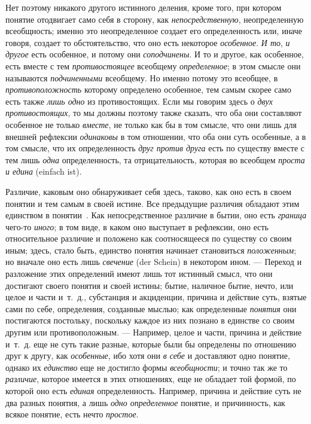 \documentclass[twoside]{article}
\begin{document}
{{\label{bkm:bm22a}Нет поэтому никакого другого истинного
деления, кроме того, при котором понятие отодвигает само себя в сторону,
как {\em непосредственную},
неопределенную всеобщность; именно это
неопределенное создает его определенность или, иначе говоря,
создает то обстоятельство, что оно есть некоторое
{\em особенное}.
{\em И то},
{\em и другое} есть
особенное, и потому они
{\em соподчинены}. И то и
другое, как особенное, есть вместе с тем
{\em противостоящее}
всеобщему
{\em определенное}; в
этом смысле они называются
{\em подчиненными}
всеобщему. Но именно потому это всеобщее, в
{\em противоположность}
которому определено особенное, тем самым скорее само есть
также {\em лишь одно} из
противостоящих. Если мы говорим здесь о
{\em двух противостоящих},
то мы должны поэтому также сказать, что оба они составляют
особенное не только {\em вместе},
не только как бы в том смысле, что они лишь для внешней
рефлексии {\em одинаковы}
в том отношении, что оба они суть особенные, а в том смысле,
что их определенность {\em друг против
друга} есть по существу вместе с тем лишь
{\em одна}
определенность, та отрицательность, которая во всеобщем
{\em проста и едина} (einfach ist).

Различие, каковым оно обнаруживает себя здесь, таково, как оно
есть в своем понятии и тем самым в своей истине. Все предыдущие различия
обладают этим единством в
понятии~\label{bkm:bm17}.
Как непосредственное различие в бытии, оно есть
{\em граница} чего-то
{\em иного}; в том
виде, в каком оно выступает в рефлексии, оно есть относительное различие и
положено как соотносящееся по существу со своим иным; здесь, стало быть,
единство понятия начинает становиться
{\em положенным}; но
вначале оно есть лишь {\em свечение}
(der Schein) в некотором ином. — Переход и
разложение этих определений имеют лишь тот истинный смысл, что они
достигают своего понятия и своей истины; бытие, наличное бытие, нечто, или
целое и части и~т.~д., субстанция и акциденции, причина и действие суть,
взятые сами по себе, определения, созданные мыслью; как определенные
{\em понятия} они
постигаются постольку, поскольку каждое из них познано в единстве со своим
другим или противоположным. — Например, целое и части,
причина и действие и~т.~д. еще не суть такие разные, которые были бы
определены по отношению друг к другу, как
{\em особенные}, ибо хотя
они {\em в себе} и
доставляют одно понятие, однако их
{\em единство} еще не
достигло формы {\em всеобщности};
и точно так же то
{\em различие}, которое
имеется в этих отношениях, еще не обладает той формой, по которой оно есть
{\em единая}
определенность. Например, причина и действие суть не два
разных понятия, а лишь {\em одно
определенное} понятие, и причинность, как всякое понятие,
есть нечто {\em простое}.

}}
\end{document}

